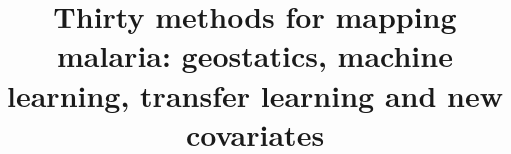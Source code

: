\documentclass{bmcart}
\begin{document}
\begin{frontmatter}

\begin{fmbox}


\title{Thirty methods for mapping malaria: geostatics, machine learning, transfer learning and new covariates}


\author[
   addressref={aff1},                   %
   corref={aff1},                       %
   email={timcdlucas@gmail.com}   %
]{ }
\author[
   addressref={aff1}
]{ }
\author[
   addressref={aff1}
]{ }
\author[
   addressref={aff1}
]{ }
\author[
   addressref={aff1}
]{ }
\author[
   addressref={aff1}
]{ }
\author[
   addressref={aff1}
]{ }
\author[
   addressref={aff1}
]{ }
\author[
   addressref={aff1}
]{ }
\author[
   addressref={aff1}
]{ }
\author[
   addressref={aff1}
]{ }
\author[
   addressref={aff1}
]{ }
\author[
   addressref={aff1}
]{ }
\author[
   addressref={aff1}
]{ }
\author[
   addressref={aff1}
]{ }
\author[
   addressref={aff1}
]{ }




\end{fmbox}
\end{frontmatter}
\end{document}
